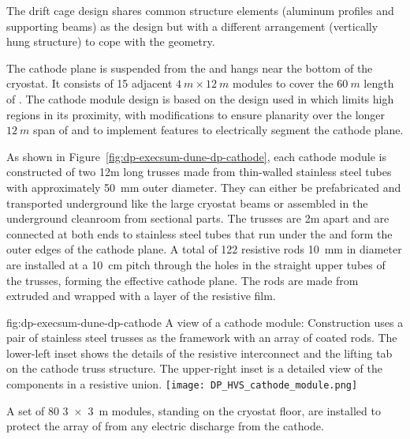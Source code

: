The drift cage design shares common structure elements (aluminum profiles and  supporting beams) as the   design but with a different arrangement (vertically hung structure) to cope with the  geometry.

The cathode plane  is suspended from the  and hangs near the  bottom of the cryostat. It consists of 15 adjacent $4~m \times 12~m$ modules to cover the $60~m$ length of . The cathode module design is based on the design used in  which limits high \efield
regions in its proximity, with modifications to ensure planarity over the longer $12~m$ span of  and to implement features to electrically segment the cathode plane.

As shown in  Figure~\ref{fig:dp-execsum-dune-dp-cathode}, each cathode module is constructed of two 12m long trusses made from thin-walled stainless steel tubes with approximately \SI{50}{mm} outer diameter. They can either be prefabricated and transported underground like the large cryostat beams or assembled in the underground cleanroom from sectional parts. The trusses are 2m apart and are connected at both ends to stainless steel tubes that run under the  and form the outer edges of the cathode plane. A total of 122 resistive rods \SI{10}{mm} in diameter are installed at a \SI{10}{cm} pitch through the holes in the straight upper tubes of the trusses, forming the effective cathode plane. The rods are made from extruded  and wrapped with a layer of the resistive film.

\begin{dunefigure}{fig:dp-execsum-dune-dp-cathode}
{A view of a  cathode module:  Construction uses a pair of stainless steel trusses as the framework with an array of coated  rods. 
The lower-left inset shows the details of the resistive interconnect and the lifting tab on the cathode truss structure. The upper-right inset is a detailed view of the components in a resistive union.}
\texttt{[image: DP\_HVS\_cathode\_module.png]}
\end{dunefigure}

A set of 80 \SI{3x3}{m} %
 modules, standing on the cryostat floor, are installed to protect the array of  from any electric discharge from the cathode.

